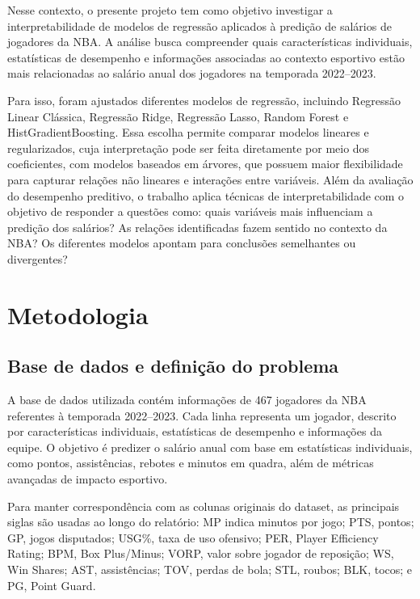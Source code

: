 \documentclass[11pt]{article}
\begin{document}
Nesse contexto, o presente projeto tem como objetivo investigar a interpretabilidade de modelos de regressão aplicados à predição de salários de jogadores da NBA. A análise busca compreender quais características individuais, estatísticas de desempenho e informações associadas ao contexto esportivo estão mais relacionadas ao salário anual dos jogadores na temporada 2022--2023.

Para isso, foram ajustados diferentes modelos de regressão, incluindo Regressão Linear Clássica, Regressão Ridge, Regressão Lasso, Random Forest e HistGradientBoosting. Essa escolha permite comparar modelos lineares e regularizados, cuja interpretação pode ser feita diretamente por meio dos coeficientes, com modelos baseados em árvores, que possuem maior flexibilidade para capturar relações não lineares e interações entre variáveis. Além da avaliação do desempenho preditivo, o trabalho aplica técnicas de interpretabilidade com o objetivo de responder a questões como: quais variáveis mais influenciam a predição dos salários? As relações identificadas fazem sentido no contexto da NBA? Os diferentes modelos apontam para conclusões semelhantes ou divergentes?

\section{Metodologia}

\subsection{Base de dados e definição do problema}

A base de dados utilizada contém informações de 467 jogadores da NBA referentes à temporada 2022--2023. Cada linha representa um jogador, descrito por características individuais, estatísticas de desempenho e informações da equipe. O objetivo é predizer o salário anual com base em estatísticas individuais, como pontos, assistências, rebotes e minutos em quadra, além de métricas avançadas de impacto esportivo.

Para manter correspondência com as colunas originais do dataset, as principais siglas são usadas ao longo do relatório: MP indica minutos por jogo; PTS, pontos; GP, jogos disputados; USG\%, taxa de uso ofensivo; PER, Player Efficiency Rating; BPM, Box Plus/Minus; VORP, valor sobre jogador de reposição; WS, Win Shares; AST, assistências; TOV, perdas de bola; STL, roubos; BLK, tocos; e PG, Point Guard.
\end{document}
